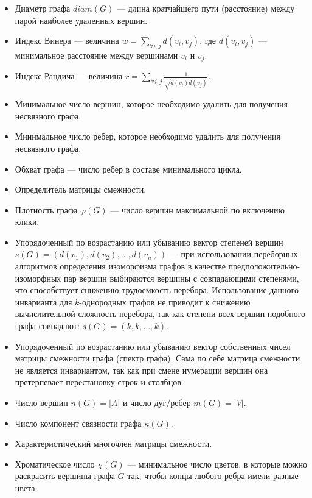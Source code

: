 \begin{itemize}
\item Диаметр графа  $diam(G)$ --- длина кратчайшего пути (расстояние) между парой наиболее удаленных вершин.
\item Индекс Винера — величина  $w=\sum _{{\forall i,j}}d(v_{i},v_{j})$, где  $d(v_{i},v_{j})$ — минимальное расстояние между вершинами  $v_{i}$ и  $v_{j}$.
\item Индекс Рандича — величина  $r=\sum _{{\forall i,j}}{\frac  {1}{{\sqrt  {d(v_{i})d(v_{j})}}}}$.
\item Минимальное число вершин, которое необходимо удалить для получения несвязного графа.
\item Минимальное число ребер, которое необходимо удалить для получения несвязного графа.
\item Обхват графа — число ребер в составе минимального цикла.
\item Определитель матрицы смежности.
\item Плотность графа  $\varphi (G)$ --- число вершин максимальной по включению клики.
\item Упорядоченный по возрастанию или убыванию вектор степеней вершин  $s(G)=(d(v_{1}),d(v_{2}),\dots ,d(v_{n}))$ --- при
использовании переборных алгоритмов определения изоморфизма графов в качестве
предположительно-изоморфных пар вершин выбираются вершины с совпадающими степенями,
что способствует снижению трудоемкость перебора. Использование данного инварианта для
$k$-однородных графов не приводит к снижению вычислительной сложность перебора, так как
степени всех вершин подобного графа совпадают:  $s(G)=(k,k,\dots ,k)$.
\item Упорядоченный по возрастанию или убыванию вектор собственных чисел матрицы смежности графа (спектр графа). Сама по себе матрица смежности не является инвариантом, так как при смене нумерации вершин она претерпевает перестановку строк и столбцов.
\item Число вершин  $n(G)=|A|$ и число дуг/ребер  $m(G)=|V|$.
\item Число компонент связности графа  $\kappa (G)$.
\item Характеристический многочлен матрицы смежности.
\item Хроматическое число  $\chi (G)$ --- минимальное число цветов, в которые можно
раскрасить вершины графа $G$ так, чтобы концы любого ребра имели разные цвета.
\end{itemize}
